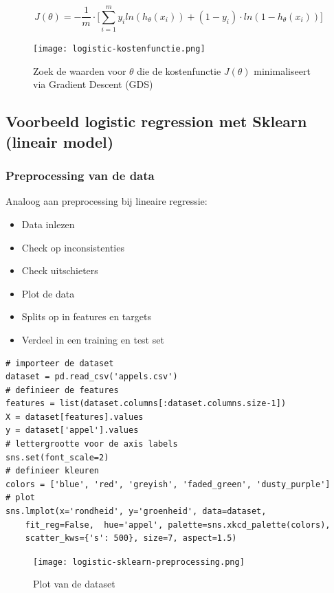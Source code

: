 \documentclass{article}
\begin{document}
\begin{equation}
J(\theta) = -\frac{1}{m} \cdot \Bigg[ \sum_{i=1}^m y_i ln(h_{\theta}(x_i)) + (1 - y_i) \cdot ln(1 - h_{\theta}(x_i)) \Bigg]
\end{equation}

\begin{figure}[H]
    \centering
    \texttt{[image: logistic-kostenfunctie.png]}
    \caption{Zoek de waarden voor $\theta$ die de kostenfunctie $J(\theta)$ minimaliseert via Gradient Descent (GDS)}
\end{figure}

\subsection{Voorbeeld logistic regression met Sklearn (lineair model)}

\subsubsection{Preprocessing van de data}

Analoog aan preprocessing bij lineaire regressie:

\begin{itemize}
    \item Data inlezen
    \item Check op inconsistenties
    \item Check uitschieters
    \item Plot de data
    \item Splits op in features en targets
    \item Verdeel in een training en test set
\end{itemize}

\begin{verbatim}
# importeer de dataset
dataset = pd.read_csv('appels.csv')
# definieer de features
features = list(dataset.columns[:dataset.columns.size-1])
X = dataset[features].values
y = dataset['appel'].values
# lettergrootte voor de axis labels
sns.set(font_scale=2) 
# definieer kleuren
colors = ['blue', 'red', 'greyish', 'faded_green', 'dusty_purple']
# plot
sns.lmplot(x='rondheid', y='groenheid', data=dataset, 
    fit_reg=False,  hue='appel', palette=sns.xkcd_palette(colors), 
    scatter_kws={'s': 500}, size=7, aspect=1.5)
\end{verbatim}

\begin{figure}[H]
    \centering
    \texttt{[image: logistic-sklearn-preprocessing.png]}
    \caption{Plot van de dataset}
\end{figure}
\end{document}
